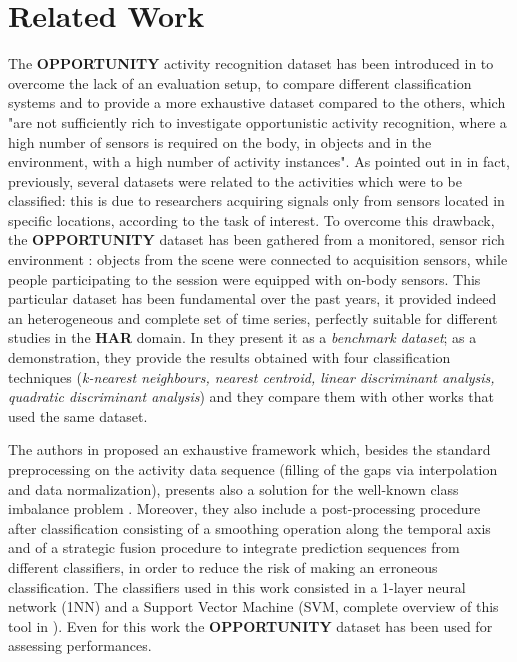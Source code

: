 
\section{Related Work}
\label{sec:related_work}
The \textbf{OPPORTUNITY} activity recognition dataset has been introduced in \cite{ComplexAct-2010} to overcome the lack of an evaluation setup, to compare different classification systems and to provide a more exhaustive dataset compared to the others, which "are not sufficiently rich to investigate opportunistic activity recognition, where a high number of sensors is required on the body, in objects and in the environment, with a high number of activity instances". As pointed out in \cite{Chavarriaga2013} in fact, previously, several datasets were related to the activities which were to be classified: this is due to researchers acquiring signals only from sensors located in specific locations, according to the task of interest.
To overcome this drawback, the \textbf{OPPORTUNITY} dataset has been gathered from a monitored, sensor rich environment  : objects from the scene were connected to acquisition sensors, while people participating to the session were equipped with on-body sensors. This particular dataset has been fundamental over the past years, it provided indeed an heterogeneous and complete set of time series, perfectly suitable for different studies in the \textbf{HAR} domain. In \cite{Chavarriaga2013} they present it as a \textit{benchmark dataset}; as a demonstration, they provide the results obtained with four classification techniques (\textit{k-nearest neighbours, nearest centroid, linear discriminant analysis, quadratic discriminant analysis}) and they compare them with other works that used the same dataset. 

The authors in \cite{cao2012integrated} proposed an exhaustive framework which, besides the standard preprocessing on the activity data sequence (filling of the gaps via interpolation and data normalization), presents also a solution for the well-known class imbalance problem \cite{japkowicz2002class}. Moreover, they also include a post-processing procedure after classification consisting of a smoothing operation along the temporal axis  and of a strategic fusion procedure to integrate prediction sequences from different classifiers, in order to reduce the risk of making an erroneous classification. The classifiers used in this work consisted in a 1-layer neural network (1NN) and a Support Vector Machine (SVM, complete overview of this tool in \cite{hearst1998support}). Even for this work the \textbf{OPPORTUNITY} dataset has been used for assessing performances.

